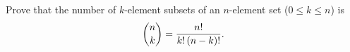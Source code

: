 Prove that the number of $k$-element subsets of an $n$-element set ($0\le k\le n$) is
\[\dbinom nk=\dfrac{n!}{k!\,(n-k)!}.\]
